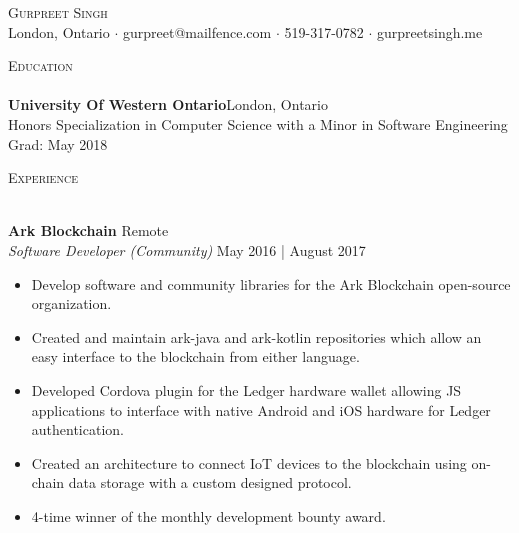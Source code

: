 \documentclass[a4paper]{article}
\newcommand{\lineunder} {
    \vspace*{-8pt} \\
    \hspace*{-18pt} \hrulefill \\
}
\newcommand{\header} [1] {
    {\hspace*{-18pt}\vspace*{6pt} \textsc{#1}}
    \vspace*{-6pt} \lineunder
}
\begin{document}
\vspace*{-40pt}

\vspace*{-10pt}
\begin{center}
	{\Huge \scshape {Gurpreet Singh}}\\
	London, Ontario $\cdot$ gurpreet@mailfence.com $\cdot$ 519-317-0782 $\cdot$ gurpreetsingh.me\\
\end{center}

\vspace*{2mm}

\header{Education}
\textbf{University Of Western Ontario}\hfill London, Ontario\\
Honors Specialization in Computer Science with a Minor in Software Engineering \hfill Grad: May 2018\\
\vspace{2mm}

\vspace*{2mm}

\header{Experience}
\vspace{1mm}

\textbf{Ark Blockchain} \hfill Remote\\
\textit{Software Developer (Community)} \hfill May 2016 | August 2017\\
\vspace{-1mm}
\begin{itemize} \itemsep 1pt
	\item Develop software and community libraries for the Ark Blockchain open-source organization.
	\item Created and maintain ark-java and ark-kotlin repositories which allow an easy interface to the blockchain from either language.
    \item Developed Cordova plugin for the Ledger hardware wallet allowing JS applications to interface with native Android and iOS hardware for Ledger authentication.
    \item Created an architecture to connect IoT devices to the blockchain using on-chain data storage with a custom designed protocol.\\
    \item 4-time winner of the monthly development bounty award.
\end{itemize}
\end{document}
